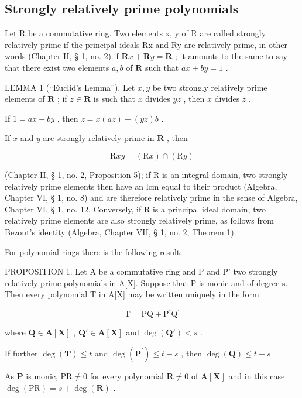 \subsection{Strongly relatively prime polynomials}

Let R be a commutative ring. Two elements x, y of R are called strongly relatively prime if the principal ideals Rx and Ry are relatively prime, in other words (Chapter II, § 1, no. 2) if \(\mathbf{R}x + \mathbf{R}y = \mathbf{R}\) ; it amounts to the same to say that there exist two elements \(a, b\) of \(\mathbf{R}\) such that \(ax + by = 1\) .

LEMMA 1 (``Euclid's Lemma''). Let \(x, y\) be two strongly relatively prime elements of \(\mathbf{R}\) ; if \(z \in \mathbf{R}\) is such that \(x\) divides \(yz\) , then \(x\) divides \(z\) .

If \(1 = ax + by\) , then \(z = x(az) + (yz)b\) .

If \(x\) and \(y\) are strongly relatively prime in \(\mathbf{R}\) , then

\[
\mathrm{R} x y = (\mathrm{R} x) \cap (\mathrm{R} y)
\]

(Chapter II, § 1, no. 2, Proposition 5); if R is an integral domain, two strongly relatively prime elements then have an lcm equal to their product (Algebra, Chapter VI, § 1, no. 8) and are therefore relatively prime in the sense of Algebra, Chapter VI, § 1, no. 12. Conversely, if R is a principal ideal domain, two relatively prime elements are also strongly relatively prime, as follows from Bezout's identity (Algebra, Chapter VII, § 1, no. 2, Theorem 1).

For polynomial rings there is the following result:

PROPOSITION 1. Let A be a commutative ring and P and P' two strongly relatively prime polynomials in A{[}X{]}. Suppose that P is monic and of degree s. Then every polynomial T in A{[}X{]} may be written uniquely in the form

\[
\mathrm{T} = \mathrm{PQ} + \mathrm{P} ^ {\prime} \mathrm{Q} ^ {\prime}\tag{1}
\]

where \(\mathbf{Q} \in \mathbf{A}[\mathbf{X}]\) , \(\mathbf{Q}' \in \mathbf{A}[\mathbf{X}]\) and \(\deg(\mathbf{Q}') < s\) .

If further \(\deg (\mathbf{T})\leqslant t\) and \(\deg (\mathbf{P}^{\prime})\leqslant t - s\) , then \(\deg (\mathbf{Q})\leqslant t - s\)

As \(\mathbf{P}\) is monic, \(\mathrm{PR} \neq 0\) for every polynomial \(\mathbf{R} \neq 0\) of \(\mathbf{A}[\mathbf{X}]\) and in this case \(\deg(\mathrm{PR}) = s + \deg(\mathbf{R})\) .

